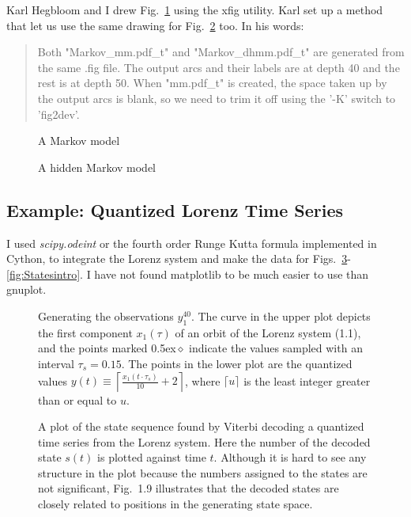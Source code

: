 \documentclass[prelim,showlabels]{book}
\newcommand{\Tsamp}{\tau_s }
\newcommand{\ceil}[1]{\lceil#1\rceil}
\newcommand{\bceil}[1]{\left\lceil#1\right\rceil}
\newcommand{\ti}[2]{{#1}{(#2)}}                  %
\newcommand{\ts}[3]{#1_{#2}^{#3}}                    %
\begin{document}
Karl Hegbloom and I drew Fig.~\ref{fig:mm} using the xfig utility.
Karl set up a method that let us use the same drawing for
Fig.~\ref{fig:dhmm} too.  In his words:
\begin{quote} 
  Both "Markov\_mm.pdf\_t" and "Markov\_dhmm.pdf\_t" are generated from
  the same .fig file.  The output arcs and their labels are at depth
  40 and the rest is at depth 50.  When "mm.pdf\_t" is created, the
  space taken up by the output arcs is blank, so we need to trim it
  off using the '-K' switch to 'fig2dev'.
\end{quote}

\begin{figure}[htbp]
  \centering{
    \resizebox{\textwidth}{!}{ }
  }
  \caption[A Markov model.]{A Markov model}
  \label{fig:mm}
\end{figure}

\begin{figure}[htbp]
  \centering{
    
  }
  \caption[A hidden Markov model.]{A hidden Markov model}
  \label{fig:dhmm}
\end{figure}

\subsection{Example: Quantized Lorenz Time Series}
\label{sec:QuantizedLorenz}

I used \emph{scipy.odeint} or the fourth order Runge Kutta formula
implemented in Cython, to integrate the Lorenz system and make the
data for Figs.~\ref{fig:TSintro}-\ref{fig:Statesintro}.  I have not
found matplotlib to be much easier to use than gnuplot.
\begin{figure}[htbp]
  \caption[Generating the observations $\ts{y}{1}{40}$.]%
  {Generating the observations $\ts{y}{1}{40}$.  The curve in the
    upper plot depicts the first component $\ti{x_1}{\tau}$ of an
    orbit of the Lorenz system (1.1), and the points
    marked {\scriptsize\raise0.5ex\hbox{$\bm{\diamond}\!$}} indicate the
    values sampled with an interval $\Tsamp = 0.15$.  The points
    in the lower plot are the quantized values $\ti{y}{t} \equiv
    \bceil{\frac{\ti{x_1}{t \cdot \Tsamp}}{10} + 2}$, where
    $\ceil{u}$ is the least integer greater than or equal to $u$.  }
  \label{fig:TSintro} 
\end{figure}

 \begin{figure}[htbp]
   \caption{A plot of the state sequence found by Viterbi decoding a quantized
     time series from the Lorenz system.  Here the number of the
     decoded state $\ti{s}{t}$ is plotted against time $t$.  Although
     it is hard to see any structure in the plot because the numbers
     assigned to the states are not significant,
     Fig.~1.9 illustrates that the decoded states
     are closely related to positions in the generating state space.}
   \label{fig:STSintro}
 \end{figure}
\end{document}
